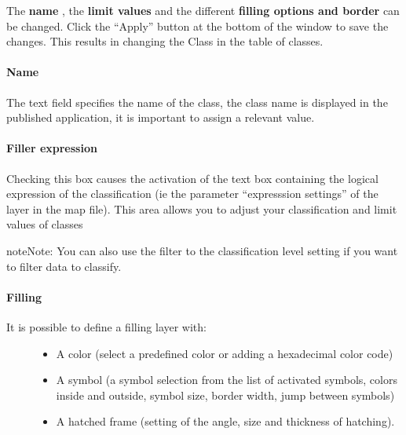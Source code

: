 \documentclass[letterpaper,10pt,english]{sphinxmanual}
\begin{document}
The \textbf{name} , the \textbf{limit values} ​​and the different \textbf{filling options and border} can be changed. Click the ``Apply'' button at the bottom of the window to save the changes. This results in changing the Class in the table of classes.
\paragraph{Name}

The text field specifies the name of the class, the class name is displayed in the published application, it is important to assign a relevant value.
\paragraph{Filler expression}

Checking this box causes the activation of the text box containing the logical expression of the classification (ie the parameter ``expresssion settings'' of the layer in the map file). This area allows you to adjust your classification and limit values ​​of classes

\begin{notice}{note}{Note:}
You can also use the filter to the classification level setting if you want to filter data to classify.
\end{notice}
\paragraph{Filling}
\begin{description}
\item[{It is possible to define a filling layer with:}] \leavevmode\begin{itemize}
\item {} 
A color (select a predefined color or adding a hexadecimal color code)

\item {} 
A symbol (a symbol selection from the list of activated symbols, colors inside and outside, symbol size, border width, jump between symbols)

\item {} 
A hatched frame (setting of the angle, size and thickness of hatching).

\end{itemize}

\end{description}
\end{document}
